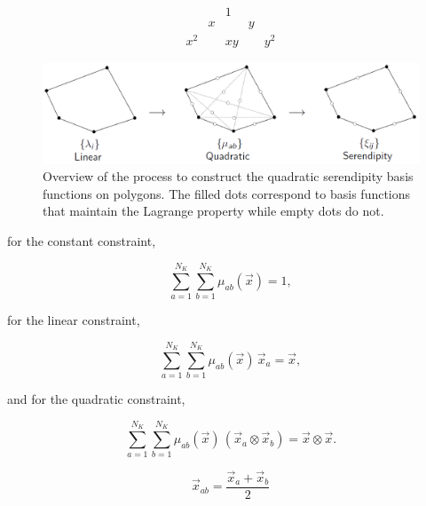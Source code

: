 \begin{equation}
\label{eq::BF_quad_pascal}
\begin{array}{ccccc}
 & & 1 & & \\
 & x & & y & \\
 x^2 &  &xy & & y^2
\end{array}
\end{equation}

\begin{figure}[hbt]
\centering
\includegraphics[width=\textwidth]{figures/sec_BF/linear_to_quad_process.png}
\caption{Overview of the process to construct the quadratic serendipity basis functions on polygons. The filled dots correspond to basis functions that maintain the Lagrange property while empty dots do not.}
\label{fig::BF_2D_quad_process}
\end{figure}

for the constant constraint,

\begin{equation}
\label{eq::BF_quad_interp_req_constant}
\sum_{a=1}^{ N_K} \sum_{b=1}^{ N_K}  \mu_{ab} (\vec{x})  = 1 ,
\end{equation}

\noindent for the linear constraint,

\begin{equation}
\label{eq::BF_quad_interp_req_linear}
\sum_{a=1}^{ N_K} \sum_{b=1}^{ N_K} \mu_{ab} (\vec{x}) \, \vec{x}_a   = \vec{x} ,
\end{equation}

\noindent and for the quadratic constraint,

\begin{equation}
\label{eq::BF_quad_interp_req_quadratic}
\sum_{a=1}^{ N_K} \sum_{b=1}^{ N_K}  \mu_{ab} (\vec{x}) \, \left( \vec{x}_a \otimes \vec{x}_b \right) =  \vec{x} \otimes \vec{x} .
\end{equation}


\begin{equation}
\label{eq::BF_Quad_abbrev_pos}
\vec{x}_{ab} = \frac{\vec{x}_a + \vec{x}_b}{2}
\end{equation}

